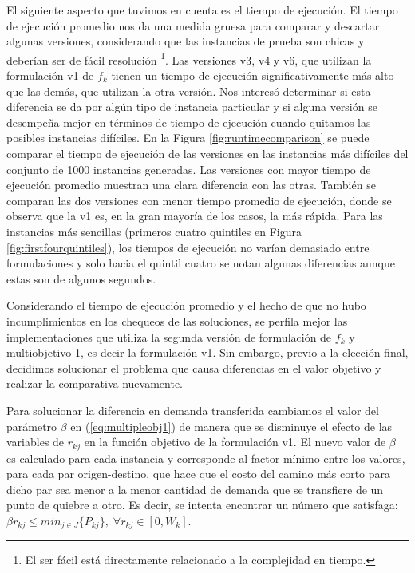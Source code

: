 \documentclass{article}
\begin{document}
  El siguiente aspecto que tuvimos en cuenta es el tiempo de ejecución. El tiempo de ejecución promedio nos da una medida gruesa para comparar y descartar algunas versiones, considerando que las instancias de prueba son chicas y deberían ser de fácil resolución \footnote{El ser fácil está directamente relacionado a la complejidad en tiempo.}. Las versiones v3, v4 y v6, que utilizan la formulación v1 de $f_k$ tienen un tiempo de ejecución significativamente más alto que las demás, que utilizan la otra versión. Nos interesó determinar si esta diferencia se da por algún tipo de instancia particular y si alguna versión se desempeña mejor en términos de tiempo de ejecución cuando quitamos las posibles instancias difíciles. En la Figura \ref{fig:runtimecomparison} se puede comparar el tiempo de ejecución de las versiones en las instancias más difíciles del conjunto de 1000 instancias generadas. Las versiones con mayor tiempo de ejecución promedio muestran una clara diferencia con las otras. También se comparan las dos versiones con menor tiempo promedio de ejecución, donde se observa que la v1 es, en la gran mayoría de los casos, la más rápida. Para las instancias más sencillas (primeros cuatro quintiles en Figura \ref{fig:firstfourquintiles}), los tiempos de ejecución no varían demasiado entre formulaciones y solo hacia el quintil cuatro se notan algunas diferencias aunque estas son de algunos segundos.

  Considerando el tiempo de ejecución promedio y el hecho de que no hubo incumplimientos en los chequeos de las soluciones, se perfila mejor las implementaciones que utiliza la segunda versión de formulación de $f_k$ y multiobjetivo 1, es decir la formulación v1. Sin embargo, previo a la elección final, decidimos solucionar el problema que causa diferencias en el valor objetivo y realizar la comparativa nuevamente.

  Para solucionar la diferencia en demanda transferida cambiamos el valor del parámetro $\beta$ en (\ref{eq:multipleobj1}) de manera que se disminuye el efecto de las variables de $r_{kj}$ en la función objetivo de la formulación v1. El nuevo valor de $\beta$ es calculado para cada instancia y corresponde al factor mínimo entre los valores, para cada par origen-destino, que hace que el costo del camino más corto para dicho par sea menor a la menor cantidad de demanda que se transfiere de un punto de quiebre a otro. Es decir, se intenta encontrar un número que satisfaga: $\beta r_{kj} \leq min_{j \in J} \{ P_{kj} \},\; \forall r_{kj} \in [0, W_k]$.
\end{document}
